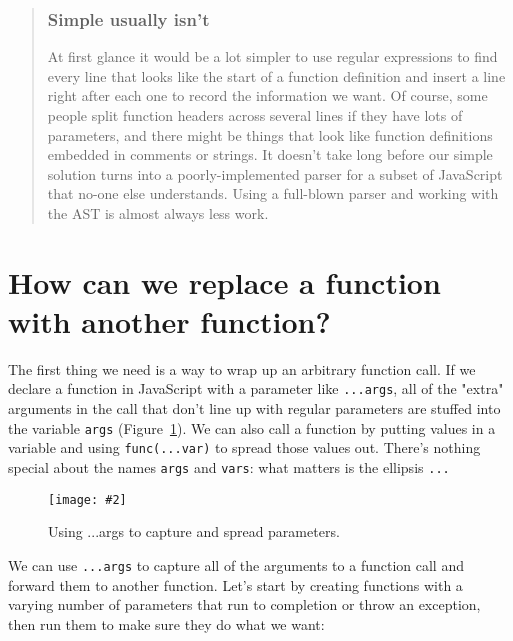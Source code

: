 \documentclass[krantzl]{krantz}
\newcommand{\figpdf}[4]{\begin{figure}%
\centering%
\texttt{[image: \#2]}%
\caption{#3}%
\label{#1}%
\end{figure}}
\newcommand{\figref}[1]{Figure~\ref{#1}}
\newenvironment{callout}{\savenotes\begin{tBox}\begin{quotation}\toggletrue{inbox}\renewcommand{\thempfootnote}{\arabic{footnote}}}{\end{quotation}\vspace{\baselineskip}\end{tBox}\togglefalse{inbox}\spewnotes}
\begin{document}
\begin{callout}


\subsubsection*{Simple usually isn't}


At first glance it would be a lot simpler
to use regular expressions to find every line that looks like the start of a function definition
and insert a line right after each one
to record the information we want.
Of course,
some people split function headers across several lines if they have lots of parameters,
and there might be things that look like function definitions embedded in comments or strings.
It doesn't take long before our simple solution turns into
a poorly-implemented parser for a subset of JavaScript that no-one else understands.
Using a full-blown parser and working with the AST is almost always less work.

\end{callout}

\section{How can we replace a function with another function?}\label{code-generator-replace}


The first thing we need is a way to wrap up an arbitrary function call.
If we declare a function in JavaScript with a parameter like \texttt{...args},
all of the "extra" arguments in the call that don't line up with regular parameters
are stuffed into the variable \texttt{args}
(\figref{code-generator-spread}).
We can also call a function by putting values in a variable
and using \texttt{func(...var)} to spread those values out.
There's nothing special about the names \texttt{args} and \texttt{vars}:
what matters is the ellipsis \texttt{...}

\figpdf{code-generator-spread}{./code-generator/spread.pdf}{Using ...args to capture and spread parameters.}{0.6}


We can use \texttt{...args} to capture all of the arguments to a function call
and forward them to another function.
Let's start by creating functions with a varying number of parameters
that run to completion or throw an exception,
then run them to make sure they do what we want:
\end{document}
